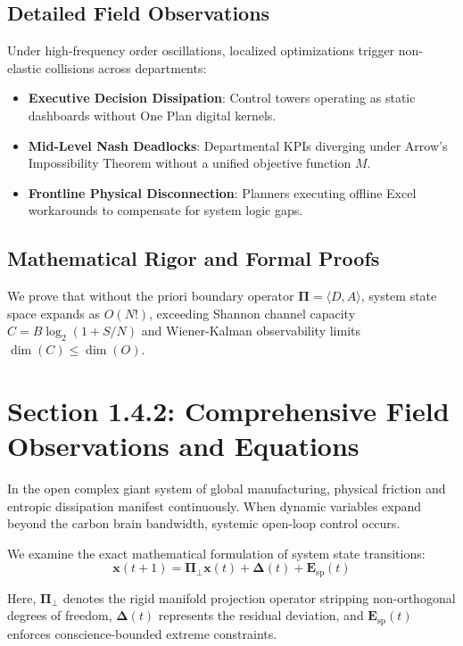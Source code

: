 \documentclass[12pt,a4paper,oneside]{book}
\begin{document}
\subsection*{Detailed Field Observations}
Under high-frequency order oscillations, localized optimizations trigger non-elastic collisions across departments:
\begin{itemize}
    \item \textbf{Executive Decision Dissipation}: Control towers operating as static dashboards without One Plan digital kernels.
    \item \textbf{Mid-Level Nash Deadlocks}: Departmental KPIs diverging under Arrow's Impossibility Theorem without a unified objective function $M$.
    \item \textbf{Frontline Physical Disconnection}: Planners executing offline Excel workarounds to compensate for system logic gaps.
\end{itemize}

\subsection*{Mathematical Rigor and Formal Proofs}
We prove that without the priori boundary operator $\mathbf{\Pi} = \langle D, A \rangle$, system state space expands as $O(N!)$, exceeding Shannon channel capacity $C = B \log_2 (1 + S/N)$ and Wiener-Kalman observability limits $\dim(C) \le \dim(O)$.
\clearpage
\section{Section 1.4.2: Comprehensive Field Observations and Equations}

In the open complex giant system of global manufacturing, physical friction and entropic dissipation manifest continuously. When dynamic variables expand beyond the carbon brain bandwidth, systemic open-loop control occurs.

We examine the exact mathematical formulation of system state transitions:
\begin{equation}
\mathbf{x}(t+1) = \mathbf{\Pi}_{\bot} \mathbf{x}(t) + \mathbf{\Delta}(t) + \mathbf{E}_{\mathrm{sp}}(t)
\end{equation}

Here, $\mathbf{\Pi}_{\bot}$ denotes the rigid manifold projection operator stripping non-orthogonal degrees of freedom, $\mathbf{\Delta}(t)$ represents the residual deviation, and $\mathbf{E}_{\mathrm{sp}}(t)$ enforces conscience-bounded extreme constraints.
\end{document}
